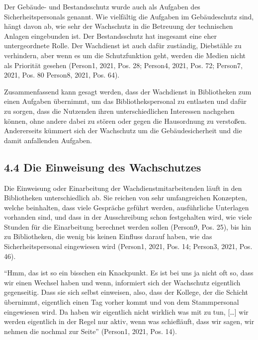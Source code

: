 \documentclass[a4paper,
fontsize=11pt,
oneside,
numbers=noperiodatend,
parskip=half-,
bibliography=totoc,
final
]{scrartcl}
\begin{document}
Der Gebäude- und Bestandsschutz wurde auch als Aufgaben des
Sicherheitspersonals genannt. Wie vielfältig die Aufgaben im
Gebäudeschutz sind, hängt davon ab, wie sehr der Wachschutz in die
Betreuung der technischen Anlagen eingebunden ist. Der Bestandsschutz
hat insgesamt eine eher untergeordnete Rolle. Der Wachdienst ist auch
dafür zuständig, Diebstähle zu verhindern, aber wenn es um die
Schutzfunktion geht, werden die Medien nicht als Priorität gesehen
(Person1, 2021, Pos. 28; Person4, 2021, Pos. 72; Person7, 2021, Pos. 80
Person8, 2021, Pos. 64).

Zusammenfassend kann gesagt werden, dass der Wachdienst in Bibliotheken
zum einen Aufgaben übernimmt, um das Bibliothekspersonal zu entlasten
und dafür zu sorgen, dass die Nutzenden ihren unterschiedlichen
Interessen nachgehen können, ohne andere dabei zu stören oder gegen die
Hausordnung zu verstoßen. Andererseits kümmert sich der Wachschutz um
die Gebäudesicherheit und die damit anfallenden Aufgaben.

\hypertarget{die-einweisung-des-wachschutzes}{%
\subsection{4.4 Die Einweisung des
Wachschutzes}\label{die-einweisung-des-wachschutzes}}

Die Einweisung oder Einarbeitung der Wachdienstmitarbeitenden läuft in
den Bibliotheken unterschiedlich ab. Sie reichen von sehr umfangreichen
Konzepten, welche beinhalten, dass viele Gespräche geführt werden,
ausführliche Unterlagen vorhanden sind, und dass in der Ausschreibung
schon festgehalten wird, wie viele Stunden für die Einarbeitung
berechnet werden sollen (Person9, Pos. 25), bis hin zu Bibliotheken, die
wenig bis keinen Einfluss darauf haben, wie das Sicherheitspersonal
eingewiesen wird (Person1, 2021, Pos. 14; Person3, 2021, Pos. 46).

\begin{flushright}
\enquote{Hmm, das ist so ein bisschen ein Knackpunkt. Es ist bei uns ja
nicht oft so, dass wir einen Wechsel haben und wenn, informiert sich der
Wachschutz eigentlich gegenseitig. Dass sie sich selbst einweisen, also,
dass der Kollege, der die Schicht übernimmt, eigentlich einen Tag vorher
kommt und von dem Stammpersonal eingewiesen wird. Da haben wir
eigentlich nicht wirklich was mit zu tun, {[}\ldots{]} wir werden
eigentlich in der Regel nur aktiv, wenn was schiefläuft, dass wir sagen,
wir nehmen die nochmal zur Seite} \linebreak(Person1, 2021, Pos. 14).
\end{flushright}
\end{document}
